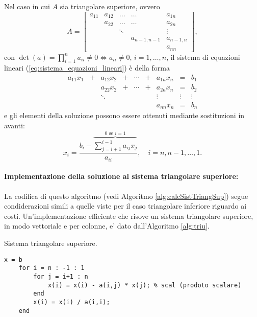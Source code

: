 Nel caso in cui $A$ sia triangolare superiore, ovvero
\begin{equation*}
    A= 
\begin{bmatrix}
   a_{11} & a_{12} & \hdots & \hdots & a_{1n}\\
          & a_{22} & \hdots & \hdots & a_{2n}\\
          && \ddots & &\vdots\\
          &&& a_{n-1,n-1} & a_{n-1,n}\\
          & & & & a_{nn}
\end{bmatrix},
\end{equation*}
con $\det(a)=\prod_{i=1}^n a_{ii}\neq 0\iff a_{ii}\neq 0,\, i = 1,\hdots, n$, il sistema di equazioni lineari (\ref{eq:sistema_equazioni_lineari}) è della forma
\begin{equation*}
    \begin{matrix}
        a_{11} x_1 &+& a_{12} x_2 &+& \cdots &+& a_{1n} x_n &=& b_1\\
        && a_{22}x_2 &+& \cdots &+& a_{2n}x_n &=& b_2\\
        && \ddots && && \vdots &\vdots& \vdots\\
        && && && a_{nn}x_n &=& b_n
    \end{matrix}
\end{equation*}
e gli elementi della soluzione possono essere ottenuti mediante sostituzioni in avanti:
\begin{equation}\label{eq:solSistTriangSup}
    x_i=\frac{b_i-\overbrace{\sum_{j=i+1}^{i-1}a_{ij}x_j}^{\text{0 se $i=1$}}}{a_{ii}},\quad i=n, n-1, \hdots, 1.
\end{equation}

\paragraph{Implementazione della soluzione al sistema triangolare superiore:} La codifica di questo algoritmo (vedi Algoritmo  \ref{alg:calcSistTriangSup}) segue condiderazioni simili a quelle viste per il caso triangolare inferiore riguardo ai costi. Un'implementazione efficiente che risove un sistema triangolare superiore, in modo vettoriale e per colonne, e' dato dall'Algoritmo \ref{alg:triu}.

\begin{algorithm}\caption{Sistema triangolare superiore.}
\label{alg:calcSistTriangSup}
    \begin{lstlisting}[style=Matlab-editor]
    x = b
    for i = n : -1 : 1
        for j = i+1 : n
            x(i) = x(i) - a(i,j) * x(j); % scal (prodoto scalare)
        end
        x(i) = x(i) / a(i,i);
    end
    \end{lstlisting}
\end{algorithm}

